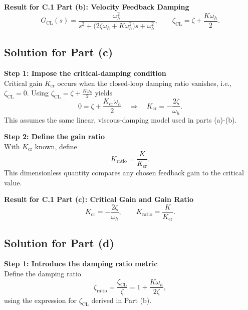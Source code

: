 \documentclass[12pt]{article}
\begin{document}
\begin{resultsbox}
\textbf{Result for C.1 Part (b): Velocity Feedback Damping}\\[0.5em]
\[
G_{\text{CL}}(s)=\frac{\omega_h^2}{s^2+\bigl(2\zeta\omega_h + K\omega_h^2\bigr)s+\omega_h^2},
\qquad
\zeta_{\text{CL}} = \zeta + \frac{K\omega_h}{2}.
\]
\end{resultsbox}

\clearpage
\subsection*{Solution for Part (c)}

\begin{stepbox}
\textbf{Step 1: Impose the critical-damping condition}\\[0.5em]
Critical gain $K_{\mathrm{cr}}$ occurs when the closed-loop damping ratio vanishes, i.e., $\zeta_{\text{CL}}=0$. Using $\zeta_{\text{CL}}=\zeta + \tfrac{K\omega_h}{2}$ yields
\[
0 = \zeta + \frac{K_{\mathrm{cr}}\omega_h}{2}
\quad\Rightarrow\quad
K_{\mathrm{cr}} = -\frac{2\zeta}{\omega_h}.
\]
This assumes the same linear, viscous-damping model used in parts (a)-(b).
\end{stepbox}

\begin{stepbox}
\textbf{Step 2: Define the gain ratio}\\[0.5em]
With $K_{\mathrm{cr}}$ known, define
\[
K_{\text{ratio}} = \frac{K}{K_{\mathrm{cr}}}.
\]
This dimensionless quantity compares any chosen feedback gain to the critical value.
\end{stepbox}

\begin{resultsbox}
\textbf{Result for C.1 Part (c): Critical Gain and Gain Ratio}\\[0.5em]
\[
K_{\mathrm{cr}} = -\frac{2\zeta}{\omega_h},
\qquad
K_{\text{ratio}} = \frac{K}{K_{\mathrm{cr}}}.
\]
\end{resultsbox}

\clearpage
\subsection*{Solution for Part (d)}

\begin{stepbox}
\textbf{Step 1: Introduce the damping ratio metric}\\[0.5em]
Define the damping ratio
\[
\zeta_{\text{ratio}} = \frac{\zeta_{\text{CL}}}{\zeta}
= 1 + \frac{K\omega_h}{2\zeta},
\]
using the expression for $\zeta_{\text{CL}}$ derived in Part (b).
\end{stepbox}
\end{document}
